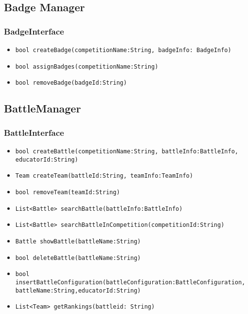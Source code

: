 \subsection{Badge Manager}
\subsubsection{BadgeInterface}
\begin{itemize}
    \item \texttt{bool createBadge(competitionName:String, badgeInfo: BadgeInfo)}%
    \item \texttt{bool assignBadges(competitionName:String)}
    \item \texttt{bool removeBadge(badgeId:String)}
\end{itemize}

\subsection{BattleManager}
\subsubsection{BattleInterface}
\begin{itemize}
    \item \texttt{bool createBattle(competitionName:String, battleInfo:BattleInfo,\\ educatorId:String)}
    \item \texttt{Team createTeam(battleId:String, teamInfo:TeamInfo)}%
    \item \texttt{bool removeTeam(teamId:String)}
    \item \texttt{List<Battle> searchBattle(battleInfo:BattleInfo)}
    \item \texttt{List<Battle> searchBattleInCompetition(competitionId:String)}%
    \item \texttt{Battle showBattle(battleName:String)}
    \item \texttt{bool deleteBattle(battleName:String)}
    \item \texttt{bool insertBattleConfiguration(battleConfiguration:BattleConfiguration, \\battleName:String,educatorId:String)}%
    \item \texttt{List<Team> getRankings(battleid: String)}
\end{itemize}

